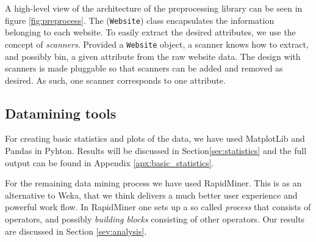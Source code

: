 A high-level view of the architecture of the preprocessing library can be seen in figure \ref{fig:preprocess}. The (\texttt{Website}) class encapsulates the information belonging to each website. To easily extract the desired attributes, we use the concept of \textit{scanners}. Provided  a \texttt{Website} object, a scanner knows how to extract, and possibly bin, a given attribute from the raw website data. The design with scanners is made pluggable so that scanners can be added and removed as desired. As such, one scanner corresponds to one attribute.


\subsection{Datamining tools}
\label{subsec:weka}

For creating basic statistics and plots of the data, we have used MatplotLib\cite{matplotlib} and Pandas\cite{pandas} in Pyhton. Results will be discussed in Section\ref{sec:statistics} and the full output can be found in Appendix \ref{apx:basic_statistics}.

For the remaining data mining process we have used RapidMiner\cite{rapidminer}. This is as an alternative to Weka\cite{weka}, that we think delivers a much better user experience and powerful work flow. In RapidMiner one sets up a so called {\it process} that consists of operators, and possibly {\it building blocks} consisting of other operators. Our results are discussed in Section \ref{sev:analysis}.




